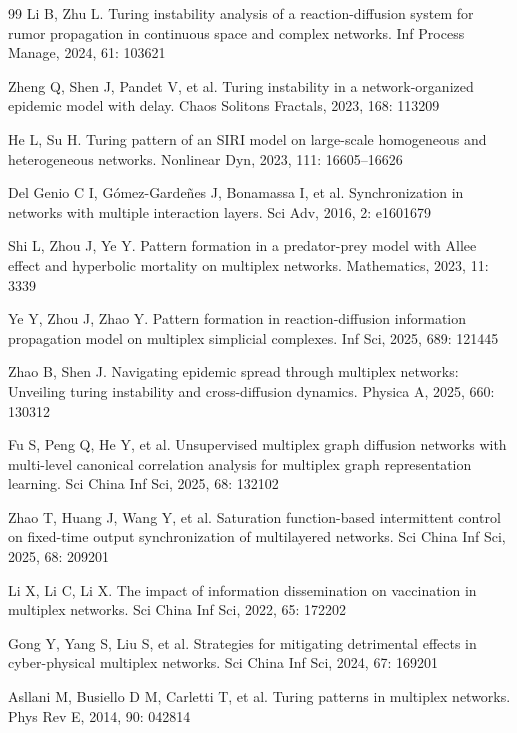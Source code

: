 \documentclass{SCIS2026}
\begin{document}
\begin{thebibliography}{99}
	Li B, Zhu L. Turing instability analysis of a reaction-diffusion system for rumor propagation in continuous space and complex networks. Inf Process Manage, 2024, 61: 103621

	Zheng Q, Shen J, Pandet V, et al. Turing instability in a network-organized epidemic model with delay. Chaos Solitons Fractals, 2023, 168: 113209

	He L, Su H. Turing pattern of an SIRI model on large-scale homogeneous and heterogeneous networks. Nonlinear Dyn, 2023, 111: 16605--16626

	Del Genio C I, G\'omez-Garde\~nes J, Bonamassa I, et al. Synchronization in networks with multiple interaction layers. Sci Adv, 2016, 2: e1601679

	Shi L, Zhou J, Ye Y. Pattern formation in a predator-prey model with Allee effect and hyperbolic mortality on multiplex networks. Mathematics, 2023, 11: 3339

	Ye Y, Zhou J, Zhao Y. Pattern formation in reaction-diffusion information propagation model on multiplex simplicial complexes. Inf Sci, 2025, 689: 121445

	Zhao B, Shen J. Navigating epidemic spread through multiplex networks: Unveiling turing instability and cross-diffusion dynamics. Physica A, 2025, 660: 130312

	Fu S, Peng Q, He Y, et al. Unsupervised multiplex graph diffusion networks with multi-level canonical correlation analysis for multiplex graph representation learning. Sci China Inf Sci, 2025, 68: 132102

	Zhao T, Huang J, Wang Y, et al. Saturation function-based intermittent control on fixed-time output synchronization of multilayered networks. Sci China Inf Sci, 2025, 68: 209201

	Li X, Li C, Li X. The impact of information dissemination on vaccination in multiplex networks. Sci China Inf Sci, 2022, 65: 172202

	Gong Y, Yang S, Liu S, et al. Strategies for mitigating detrimental effects in cyber-physical multiplex networks. Sci China Inf Sci, 2024, 67: 169201

	Asllani M, Busiello D M, Carletti T, et al. Turing patterns in multiplex networks. Phys Rev E, 2014, 90: 042814


\end{thebibliography}
\end{document}
